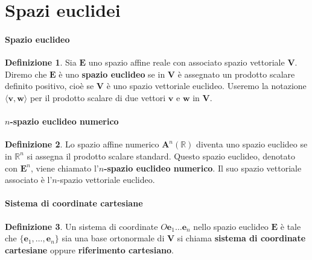 \documentclass{article}
\theoremstyle{plain}
\theoremstyle{definition}
\newtheorem{defn}{Definizione}[section]
\theoremstyle{remark}
\begin{document}
\vspace{50pt}
\section{Spazi euclidei}
\vspace{20pt}

\paragraph{Spazio euclideo}
\begin{bxthm}
\begin{defn}
Sia $\mathbf{E}$ uno spazio affine reale con associato spazio vettoriale $\mathbf{V}$. 
Diremo che $\mathbf{E}$ è uno \textbf{spazio euclideo} se in $\mathbf{V}$ è assegnato un prodotto scalare 
definito positivo, cioè se $\mathbf{V}$ è uno spazio vettoriale euclideo. Useremo la notazione 
$\langle \mathbf{v}, \mathbf{w} \rangle$ per il prodotto scalare di due vettori $\mathbf{v}$ e $\mathbf{w}$ 
in $\mathbf{V}$.    
\end{defn}
\end{bxthm}

\vspace{10pt}

\paragraph{$n$-spazio euclideo numerico}
\begin{bxthm}
\begin{defn}
Lo spazio affine numerico $\mathbf{A}^n(\mathbb{R})$ diventa uno spazio euclideo se in $\mathbb{R}^n$ si 
assegna il prodotto scalare standard. Questo spazio euclideo, denotato con $\mathbf{E}^n$, viene chiamato 
l'\textbf{$n$-spazio euclideo numerico}. Il suo spazio vettoriale associato è l'$n$-spazio vettoriale euclideo.
\end{defn}
\end{bxthm}

\vspace{10pt}

\paragraph{Sistema di coordinate cartesiane}
\begin{bxthm}
\begin{defn}
Un sistema di coordinate $O\mathbf{e}_1 \ldots \mathbf{e}_n$ nello spazio euclideo $\mathbf{E}$ è tale che 
$\{\mathbf{e}_1, \ldots, \mathbf{e}_n\}$ sia una base ortonormale di $\mathbf{V}$ si chiama 
\textbf{sistema di coordinate cartesiane} oppure \textbf{riferimento cartesiano}.     
\end{defn}
\end{bxthm}
\end{document}
